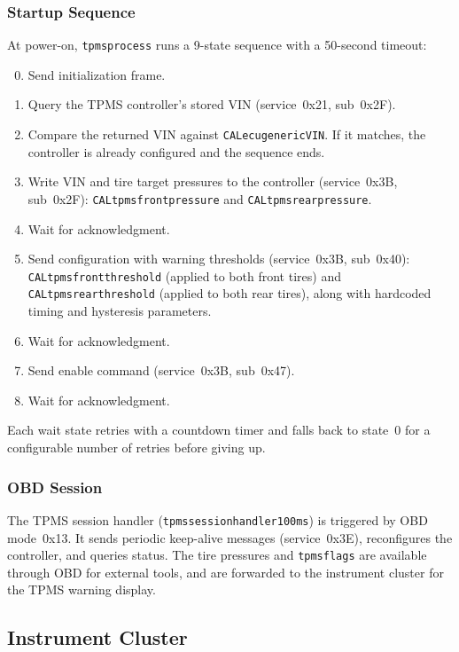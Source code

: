 \documentclass[a4paper,11pt]{article}
\renewcommand{\_}{\oldunderscore\allowbreak}
\begin{document}
\subsubsection*{Startup Sequence}

At power-on, \texttt{tpms\_process} runs a 9-state sequence with a 50-second
timeout:

\begin{enumerate}
\setcounter{enumi}{-1}
\item Send initialization frame.
\item Query the TPMS controller's stored VIN (service~0x21, sub~0x2F).
\item Compare the returned VIN against \texttt{CAL\_ecu\_generic\_VIN}. If it
      matches, the controller is already configured and the sequence ends.
\item Write VIN and tire target pressures to the controller (service~0x3B,
      sub~0x2F): \texttt{CAL\_tpms\_front\_pressure} and
      \texttt{CAL\_tpms\_rear\_pressure}.
\item Wait for acknowledgment.
\item Send configuration with warning thresholds (service~0x3B, sub~0x40):
      \texttt{CAL\_tpms\_front\_threshold} (applied to both front tires) and
      \texttt{CAL\_tpms\_rear\_threshold} (applied to both rear tires), along
      with hardcoded timing and hysteresis parameters.
\item Wait for acknowledgment.
\item Send enable command (service~0x3B, sub~0x47).
\item Wait for acknowledgment.
\end{enumerate}

Each wait state retries with a countdown timer and falls back to state~0 for a
configurable number of retries before giving up.

\subsubsection*{OBD Session}

The TPMS session handler (\texttt{tpms\_session\_handler\_100ms}) is triggered
by OBD mode~0x13. It sends periodic keep-alive messages (service~0x3E),
reconfigures the controller, and queries status. The tire pressures and
\texttt{tpms\_flags} are available through OBD for external tools, and are
forwarded to the instrument cluster for the TPMS warning display.

\subsection{Instrument Cluster}
\end{document}
